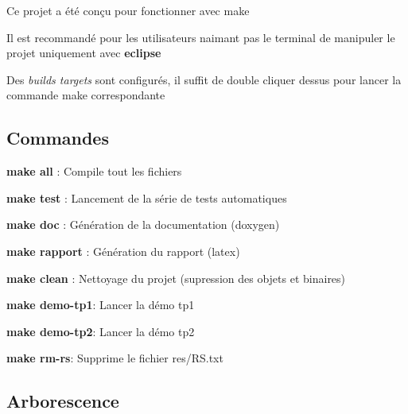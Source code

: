 Ce projet a été conçu pour fonctionner avec make

Il est recommandé pour les utilisateurs n\textquotesingle{}aimant pas le terminal de manipuler le projet uniquement avec {\bfseries eclipse}

Des {\itshape builds targets} sont configurés, il suffit de double cliquer dessus pour lancer la commande make correspondante

\subsection*{Commandes}


\begin{DoxyItemize}
\item {\bfseries make all} \+: Compile tout les fichiers
\item {\bfseries make test} \+: Lancement de la série de tests automatiques
\item {\bfseries make doc} \+: Génération de la documentation (doxygen)
\item {\bfseries make rapport} \+: Génération du rapport (latex)
\item {\bfseries make clean} \+: Nettoyage du projet (supression des objets et binaires)
\item {\bfseries make demo-\/tp1}\+: Lancer la démo tp1
\item {\bfseries make demo-\/tp2}\+: Lancer la démo tp2
\item {\bfseries make rm-\/rs}\+: Supprime le fichier res/\+R\+S.\+txt
\end{DoxyItemize}

\subsection*{Arborescence}


